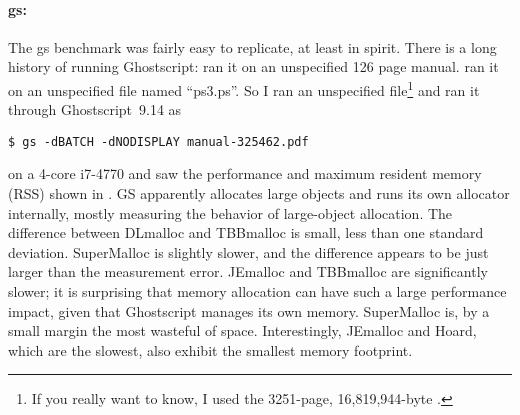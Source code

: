 \documentclass[natbib,sort&compress,10pt]{sigplanconf}
\begin{document}
{\paragraph{gs:}} The gs benchmark was fairly easy to replicate, at
least in spirit.  There is a long history of running Ghostscript:
\cite{DetlefsDoZo94} ran it on an unspecified 126 page manual.
\cite{Evans06} ran it on an unspecified file named ``ps3.ps''.  So I
ran an unspecified file\footnote{If you really want to know, I used
  the 3251-page, 16,819,944-byte \cite{Intel13}.}  and ran it through
Ghostscript~9.14 as
\begin{verbatim}
$ gs -dBATCH -dNODISPLAY manual-325462.pdf
\end{verbatim}
on a 4-core i7-4770 and saw the performance and maximum resident
memory (RSS) shown in .  GS apparently allocates large
objects and runs its own allocator internally, mostly measuring the
behavior of large-object allocation.  The difference between DLmalloc
and TBBmalloc is small, less than one standard deviation.  SuperMalloc
is slightly slower, and the difference appears to be just larger than
the measurement error.  JEmalloc and TBBmalloc are significantly
slower; it is surprising that memory allocation can have such a large
performance impact, given that Ghostscript manages its own memory.
SuperMalloc is, by a small margin the most wasteful of space.
Interestingly, JEmalloc and Hoard, which are the slowest, also exhibit
the smallest memory footprint.
\end{document}
